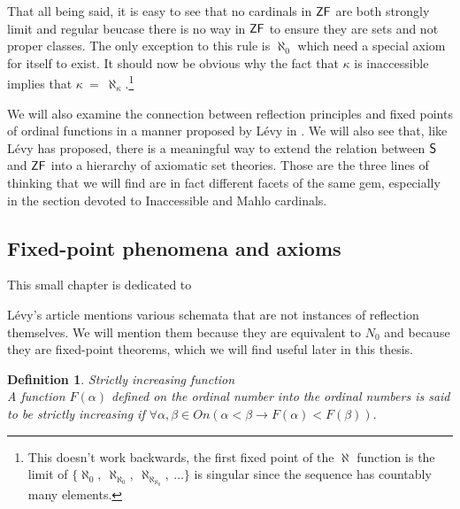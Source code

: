 \documentclass[12pt,a4paper]{article}
\newtheorem{definition}[theorem]{Definition}
\newcommand{\then}{\rightarrow}
\begin{document}
That all being said, it is easy to see that no cardinals in $\sf{ZF}$ are both strongly limit and regular beucase there is no way in $\sf{ZF}$ to ensure they are sets and not proper classes. The only exception to this rule is $\aleph_0$ which need a special axiom for itself to exist. It should now be obvious why the fact that $\kappa$ is inaccessible implies that $\kappa\ =\ \aleph_\kappa$.\footnote{This doesn't work backwards, the first fixed point of the $\aleph$ function is the limit of $\{\aleph_0,\ \aleph_{\aleph_0},\ \aleph_{\aleph_{\aleph_0}},\ \ldots \}$ is singular since the sequence has countably many elements.}

We will also examine the connection between reflection principles and fixed points of ordinal functions in a manner proposed by Lévy in \cite{Levy60a}. We will also see that, like Lévy \cite{Levy60a} has proposed, there is a meaningful way to extend the relation between $\sf{S}$ and $\sf{ZF}$ into a hierarchy of axiomatic set theories. Those are the three lines of thinking that we will find are in fact different facets of the same gem, especially in the section devoted to Inaccessible and Mahlo cardinals.


\subsection{Fixed-point phenomena and axioms}
This small chapter is dedicated to 

Lévy's article mentions various schemata that are not instances of reflection themselves. We will mention them because they are equivalent to $N_0$ and because they are fixed-point theorems, which we will find useful later in this thesis.


\begin{definition}{Strictly increasing function}\\
A function $F(\alpha)$ defined on the ordinal number into the ordinal numbers is said to be \emph{strictly increasing} if
$\forall \alpha, \beta \in On (\alpha < \beta \then F(\alpha) < F(\beta)).$
\end{definition}
\end{document}
